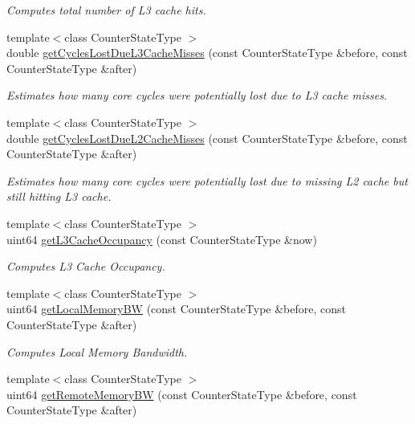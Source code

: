 \begin{DoxyCompactItemize}
\begin{DoxyCompactList}\small\item\em Computes total number of L3 cache hits. \end{DoxyCompactList}\item 
{\footnotesize template$<$class Counter\+State\+Type $>$ }\\double \mbox{\hyperlink{class_basic_counter_state_a89d4cef9c83db7e76be6a0a2e7351e2e}{get\+Cycles\+Lost\+Due\+L3\+Cache\+Misses}} (const Counter\+State\+Type \&before, const Counter\+State\+Type \&after)
\begin{DoxyCompactList}\small\item\em Estimates how many core cycles were potentially lost due to L3 cache misses. \end{DoxyCompactList}\item 
{\footnotesize template$<$class Counter\+State\+Type $>$ }\\double \mbox{\hyperlink{class_basic_counter_state_ac26765efe8a4c7341f40c8ab8bdb9af6}{get\+Cycles\+Lost\+Due\+L2\+Cache\+Misses}} (const Counter\+State\+Type \&before, const Counter\+State\+Type \&after)
\begin{DoxyCompactList}\small\item\em Estimates how many core cycles were potentially lost due to missing L2 cache but still hitting L3 cache. \end{DoxyCompactList}\item 
{\footnotesize template$<$class Counter\+State\+Type $>$ }\\uint64 \mbox{\hyperlink{class_basic_counter_state_a185f850a9a753d9cf4deb8299261fd4c}{get\+L3\+Cache\+Occupancy}} (const Counter\+State\+Type \&now)
\begin{DoxyCompactList}\small\item\em Computes L3 Cache Occupancy. \end{DoxyCompactList}\item 
{\footnotesize template$<$class Counter\+State\+Type $>$ }\\uint64 \mbox{\hyperlink{class_basic_counter_state_a3ba7c9267c6e0f338a59defc98ae0007}{get\+Local\+Memory\+BW}} (const Counter\+State\+Type \&before, const Counter\+State\+Type \&after)
\begin{DoxyCompactList}\small\item\em Computes Local Memory Bandwidth. \end{DoxyCompactList}\item 
{\footnotesize template$<$class Counter\+State\+Type $>$ }\\uint64 \mbox{\hyperlink{class_basic_counter_state_a00c97b1a7d8a7125ce7fd129cddb52e8}{get\+Remote\+Memory\+BW}} (const Counter\+State\+Type \&before, const Counter\+State\+Type \&after)

\end{DoxyCompactItemize}
